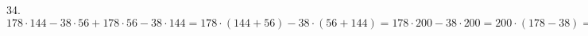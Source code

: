 34. $178\cdot144-38\cdot56+178\cdot56-38\cdot144=178\cdot(144+56)-38\cdot(56+144)=178\cdot200-38\cdot200=200\cdot(178-38)=200\cdot140=28000.$\\
